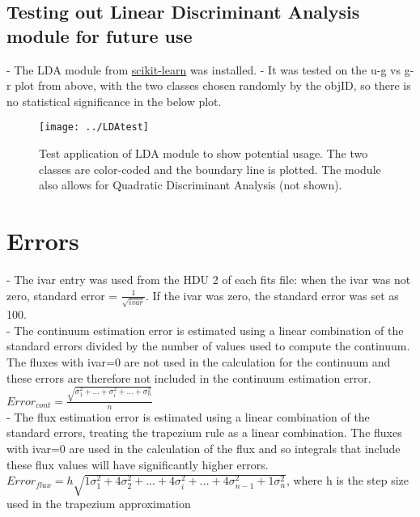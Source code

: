 \documentclass[12pt]{article}
\begin{document}
\subsection{Testing out Linear Discriminant Analysis module for future use}
- The LDA module from \href{http://scikit-learn.org/stable/install.html}{scikit-learn} was installed.
- It was tested on the u-g vs g-r plot from above, with the two classes chosen randomly by the objID, so there is no statistical significance in the below plot.\\
\begin{figure}
\texttt{[image: ../LDAtest]}\\
\caption{Test application of LDA module to show potential usage. The two classes are color-coded and the boundary line is plotted. The module also allows for Quadratic Discriminant Analysis (not shown).}
\end{figure}


\section{Errors}
- The ivar entry was used from the HDU 2 of each fits file: when the ivar was not zero, standard error =  $\frac{1}{\sqrt{ivar}}$. If the ivar was zero, the standard error was set as 100. \\
- The continuum estimation error is estimated using a linear combination of the standard errors divided by the number of values used to compute the continuum. The fluxes with ivar=0 are not used in the calculation for the continuum and these errors are therefore not included in the continuum estimation error.\\
$Error_{cont} = \frac{\sqrt{\sigma_1^2 + ... + \sigma_i^2 + ... + \sigma_n^2}}{n}$\\
- The flux estimation error is estimated using a linear combination of the standard errors, treating the trapezium rule as a linear combination. The fluxes with ivar=0 are used in the calculation of the flux and so integrals that include these flux values will have significantly higher errors.\\
$Error_{flux} = h\sqrt{1\sigma_1^2+4\sigma_2^2+ ... + 4\sigma_i^2 + ... + 4\sigma_{n-1}^2+1\sigma_n^2}$, where h is the step size used in the trapezium approximation\\
\end{document}
